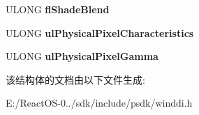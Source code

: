 \begin{DoxyCompactItemize}
\mbox{\label{struct___g_d_i_i_n_f_o_a6053f9db94ebdd0132ee0564fb3155d0}} 
U\+L\+O\+NG {\bfseries fl\+Shade\+Blend}
\item 
\mbox{\label{struct___g_d_i_i_n_f_o_a126f9b87baad181374e289326fb7c5d8}} 
U\+L\+O\+NG {\bfseries ul\+Physical\+Pixel\+Characteristics}
\item 
\mbox{\label{struct___g_d_i_i_n_f_o_a36eadf0b8e47b616c698b9baff2b9233}} 
U\+L\+O\+NG {\bfseries ul\+Physical\+Pixel\+Gamma}
\end{DoxyCompactItemize}


该结构体的文档由以下文件生成\+:\begin{DoxyCompactItemize}
\item 
E\+:/\+React\+O\+S-\/0../sdk/include/psdk/winddi.\+h\end{DoxyCompactItemize}
